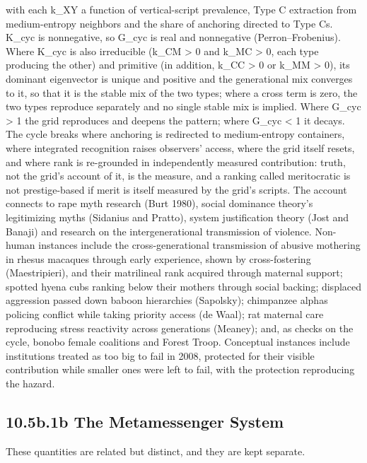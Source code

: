 \documentclass[
]{article}
\begin{document}
with each k\_XY a function of vertical-script prevalence, Type C
extraction from medium-entropy neighbors and the share of anchoring
directed to Type Cs. K\_cyc is nonnegative, so G\_cyc is real and
nonnegative (Perron--Frobenius). Where K\_cyc is also irreducible (k\_CM
\textgreater{} 0 and k\_MC \textgreater{} 0, each type producing the
other) and primitive (in addition, k\_CC \textgreater{} 0 or k\_MM
\textgreater{} 0), its dominant eigenvector is unique and positive and
the generational mix converges to it, so that it is the stable mix of
the two types; where a cross term is zero, the two types reproduce
separately and no single stable mix is implied. Where G\_cyc
\textgreater{} 1 the grid reproduces and deepens the pattern; where
G\_cyc \textless{} 1 it decays. The cycle breaks where anchoring is
redirected to medium-entropy containers, where integrated recognition
raises observers' access, where the grid itself resets, and where rank
is re-grounded in independently measured contribution: truth, not the
grid's account of it, is the measure, and a ranking called meritocratic
is not prestige-based if merit is itself measured by the grid's scripts.
The account connects to rape myth research (Burt 1980), social dominance
theory's legitimizing myths (Sidanius and Pratto), system justification
theory (Jost and Banaji) and research on the intergenerational
transmission of violence. Non-human instances include the
cross-generational transmission of abusive mothering in rhesus macaques
through early experience, shown by cross-fostering (Maestripieri), and
their matrilineal rank acquired through maternal support; spotted hyena
cubs ranking below their mothers through social backing; displaced
aggression passed down baboon hierarchies (Sapolsky); chimpanzee alphas
policing conflict while taking priority access (de Waal); rat maternal
care reproducing stress reactivity across generations (Meaney); and, as
checks on the cycle, bonobo female coalitions and Forest Troop.
Conceptual instances include institutions treated as too big to fail in
2008, protected for their visible contribution while smaller ones were
left to fail, with the protection reproducing the hazard.

\hypertarget{b.1b-the-metamessenger-system}{%
\subsection{10.5b.1b The Metamessenger
System}\label{b.1b-the-metamessenger-system}}

These quantities are related but distinct, and they are kept separate.
\end{document}
